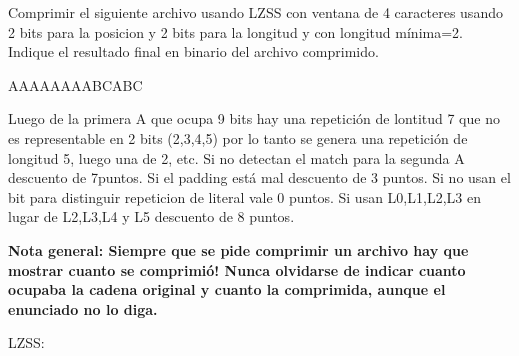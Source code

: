 \documentclass[a4paper]{article}
\newenvironment{enunciado}[3]{%
    \vspace{\baselineskip}
    \tcolorbox[beamer,%
    noparskip,breakable,
    colback=LightGreen,colframe=DarkGreen,%
    colbacklower=LimeGreen!75!LightGreen,%
    title=\small Enunciado: Año #1\, Cuatrimestre #2\, Oportunidad #3]}%
    {\endtcolorbox}
\newenvironment{criterio}[3]{%
    \tcolorbox[beamer,%
    noparskip,breakable,
    colback=LightCoral,colframe=DarkRed,%
    colbacklower=Tomato!75!LightCoral,%
    title=\small Criterio de Corrección: Año #1\, Cuatrimestre #2\, Oportunidad #3]}%
    {\endtcolorbox}
\begin{document}
    \begin{enunciado}{2014}{1}{2}
        Comprimir el siguiente archivo usando LZSS con ventana de 4 caracteres usando 2 bits para la posicion y 2 bits para la longitud y con longitud mínima=2. Indique el resultado final en binario del archivo comprimido.
    
        AAAAAAAABCABC
    \end{enunciado}

    \begin{criterio}{2014}{1}{2}
        Luego de la primera A que ocupa 9 bits hay una repetición de lontitud 7 que no es representable en 2 bits (2,3,4,5) por lo tanto se genera una repetición de longitud 5, luego una de 2, etc. Si no detectan el match para la segunda A descuento de 7puntos. Si el padding está mal descuento de 3 puntos. Si no usan el bit para distinguir repeticion de literal vale 0 puntos. Si usan L0,L1,L2,L3 en lugar de L2,L3,L4 y L5 descuento de 8 puntos.
    \end{criterio}

    \textbf{Nota general: Siempre que se pide comprimir un archivo hay que mostrar cuanto se comprimió! Nunca olvidarse de indicar cuanto ocupaba la cadena original y cuanto la comprimida, aunque el enunciado no lo diga.}

	LZSS:
\end{document}
